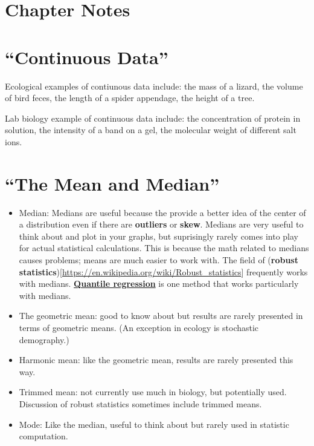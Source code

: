\documentclass[]{book}
\providecommand{\tightlist}{%
  \setlength{\itemsep}{0pt}\setlength{\parskip}{0pt}}
\theoremstyle{definition}
\theoremstyle{definition}
\theoremstyle{definition}
\theoremstyle{remark}
\begin{document}
\section*{Chapter Notes}\label{chapter-notes-3}

\section{\texorpdfstring{``Continuous
Data''}{Continuous Data}}\label{continuous-data}

Ecological examples of contiunous data include: the mass of a lizard,
the volume of bird feces, the length of a spider appendage, the height
of a tree.

Lab biology example of continuous data include: the concentration of
protein in solution, the intensity of a band on a gel, the molecular
weight of different salt ions.

\section{\texorpdfstring{``The Mean and
Median''}{The Mean and Median}}\label{the-mean-and-median}

\begin{itemize}
\tightlist
\item
  Median: Medians are useful because the provide a better idea of the
  center of a distribution even if there are \textbf{outliers} or
  \textbf{skew}. Medians are very useful to think about and plot in your
  graphs, but suprisingly rarely comes into play for actual statistical
  calculations. This is because the math related to medians causes
  problems; means are much easier to work with. The field of
  (\textbf{robust
  statistics}){[}\url{https://en.wikipedia.org/wiki/Robust_statistics}{]}
  frequently works with medians.
  \href{https://en.wikipedia.org/wiki/Quantile_regression}{\textbf{Quantile
  regression}} is one method that works particularly with medians.
\item
  The geometric mean: good to know about but results are rarely
  presented in terms of geometric means. (An exception in ecology is
  stochastic demography.)
\item
  Harmonic mean: like the geometric mean, results are rarely presented
  this way.
\item
  Trimmed mean: not currently use much in biology, but potentially used.
  Discussion of robust statistics sometimes include trimmed means.
\item
  Mode: Like the median, useful to think about but rarely used in
  statistic computation.
\end{itemize}
\end{document}
